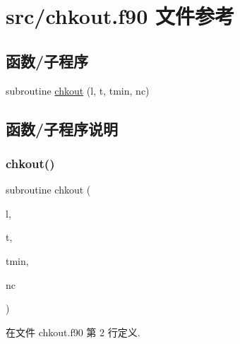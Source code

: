 \hypertarget{chkout_8f90}{}\section{src/chkout.f90 文件参考}
\label{chkout_8f90}
\subsection*{函数/子程序}
\begin{DoxyCompactItemize}
\item 
subroutine \mbox{\hyperlink{chkout_8f90_a61e8243e9bf94c163dd7cc87d01f69d4}{chkout}} (l, t, tmin, nc)
\end{DoxyCompactItemize}


\subsection{函数/子程序说明}
\mbox{\label{chkout_8f90_a61e8243e9bf94c163dd7cc87d01f69d4}} 
\subsubsection{\texorpdfstring{chkout()}{chkout()}}
{\footnotesize\ttfamily subroutine chkout (\begin{DoxyParamCaption}\item[{}]{l,  }\item[{}]{t,  }\item[{}]{tmin,  }\item[{}]{nc }\end{DoxyParamCaption})}



在文件 chkout.\+f90 第 2 行定义.

